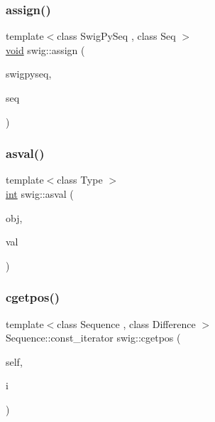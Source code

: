 \mbox{\label{namespaceswig_ad10b8f1b53b61dd4a9101e1cd8614262}} 
\subsubsection{\texorpdfstring{assign()}{assign()}}
{\footnotesize\ttfamily template$<$class Swig\+Py\+Seq , class Seq $>$ \\
\hyperlink{lp__lib_8h_ac7828c7b2b31d2e11af17bdb6289c5d9}{void} swig\+::assign (\begin{DoxyParamCaption}\item[{const Swig\+Py\+Seq \&}]{swigpyseq,  }\item[{Seq $\ast$}]{seq }\end{DoxyParamCaption})\hspace{0.3cm}{\ttfamily [inline]}}

\mbox{\label{namespaceswig_a0c849f14b53dbad5c78124f7d7be69f1}} 
\subsubsection{\texorpdfstring{asval()}{asval()}}
{\footnotesize\ttfamily template$<$class Type $>$ \\
\hyperlink{lp__lib_8h_adeb9ec6400320e4923ac9d836d509ddb}{int} swig\+::asval (\begin{DoxyParamCaption}\item[{Py\+Object $\ast$}]{obj,  }\item[{Type $\ast$}]{val }\end{DoxyParamCaption})\hspace{0.3cm}{\ttfamily [inline]}}

\mbox{\label{namespaceswig_a3e4de99498e78ee45e114f32a533f42e}} 
\subsubsection{\texorpdfstring{cgetpos()}{cgetpos()}}
{\footnotesize\ttfamily template$<$class Sequence , class Difference $>$ \\
Sequence\+::const\+\_\+iterator swig\+::cgetpos (\begin{DoxyParamCaption}\item[{const Sequence $\ast$}]{self,  }\item[{Difference}]{i }\end{DoxyParamCaption})\hspace{0.3cm}{\ttfamily [inline]}}

